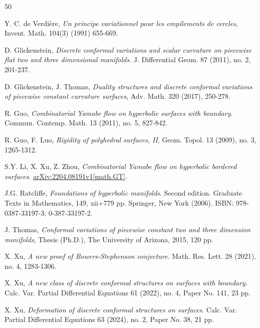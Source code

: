 \documentclass[12pt]{amsart}
\theoremstyle{definition}
\begin{document}
\begin{thebibliography}{50}
\setlength{\itemsep}{2pt} \small

 Y. C. de Verdi\`{e}re, \emph{Un principe variationnel pour les empilements de cercles}, Invent. Math. 104(3) (1991) 655-669.

 D. Glickenstein, \emph{Discrete conformal variations and scalar curvature on piecewise flat two and three dimensional manifolds}. J. Differential Geom. 87 (2011), no. 2, 201-237.


 D. Glickenstein, J. Thomas, \emph{Duality structures and discrete conformal variations of piecewise constant curvature surfaces}, Adv. Math. 320 (2017), 250-278.

 R. Guo, \emph{Combinatorial Yamabe flow on hyperbolic surfaces with boundary}. Commun. Contemp. Math. 13 (2011), no. 5, 827-842.


 R. Guo, F. Luo, \emph{Rigidity of polyhedral surfaces, II}, Geom. Topol. 13 (2009), no. 3, 1265-1312.

 S.Y. Li, X. Xu, Z. Zhou, \emph{Combinatorial Yamabe flow on hyperbolic bordered surfaces}. \href{https://arxiv.org/abs/2204.08191}{ arXiv:2204.08191v1[math.GT]}.

 J.G. Ratcliffe, \emph{Foundations of hyperbolic manifolds}. Second edition. Graduate Texts in Mathematics, 149, xii+779 pp. Springer, New York (2006). ISBN: 978-0387-33197-3; 0-387-33197-2.

 J. Thomas, \emph{Conformal variations of piecewise constant two and three dimension manifolds}, Thesis (Ph.D.), The University of Arizona, 2015, 120 pp.




 X. Xu, \emph{A new proof of Bowers-Stephenson conjecture}. Math. Res. Lett. 28 (2021), no. 4, 1283-1306.

 X. Xu, \emph{A new class of discrete conformal structures on surfaces with boundary}. Calc. Var. Partial Differential Equations 61 (2022), no. 4, Paper No. 141, 23 pp.

 X. Xu, \emph{Deformation of discrete conformal structures on surfaces}.  Calc. Var. Partial Differential Equations 63 (2024), no. 2, Paper No. 38, 21 pp.


\end{thebibliography}
\end{document}
